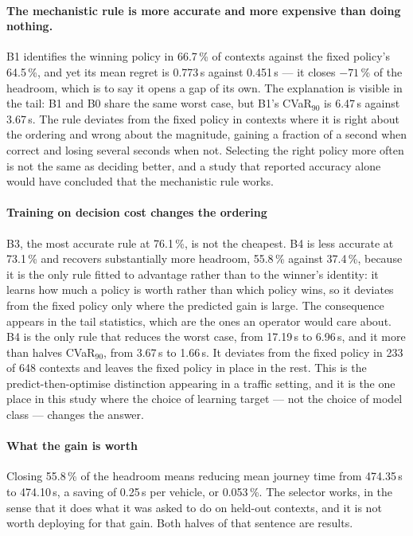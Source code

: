 \paragraph{The mechanistic rule is more accurate and more expensive than doing
nothing.} B1 identifies the winning policy in 66.7\,\% of contexts against the
fixed policy's 64.5\,\%, and yet its mean regret is 0.773\,s against 0.451\,s ---
it closes $-71$\,\% of the headroom, which is to say it opens a gap of its own.
The explanation is visible in the tail: B1 and B0 share the same worst case, but
B1's CVaR$_{90}$ is 6.47\,s against 3.67\,s. The rule deviates from the fixed
policy in contexts where it is right about the ordering and wrong about the
magnitude, gaining a fraction of a second when correct and losing several seconds
when not. Selecting the right policy more often is not the same as deciding
better, and a study that reported accuracy alone would have concluded that the
mechanistic rule works.

\paragraph{Training on decision cost changes the ordering} B3, the most accurate
rule at 76.1\,\%, is not the cheapest. B4 is less accurate at 73.1\,\% and
recovers substantially more headroom, 55.8\,\% against 37.4\,\%, because it is the
only rule fitted to advantage rather than to the winner's identity: it learns how
much a policy is worth rather than which policy wins, so it deviates from the
fixed policy only where the predicted gain is large. The consequence appears in
the tail statistics, which are the ones an operator would care about. B4 is the
only rule that reduces the worst case, from 17.19\,s to 6.96\,s, and it more than
halves CVaR$_{90}$, from 3.67\,s to 1.66\,s. It deviates from the fixed policy in
233 of 648 contexts and leaves the fixed policy in place in the rest. This is the
predict-then-optimise distinction \citep{elmachtoub2022spo} appearing in a traffic
setting, and it is the one place in this study where the choice of learning target
--- not the choice of model class --- changes the answer.

\paragraph{What the gain is worth} Closing 55.8\,\% of the headroom means
reducing mean journey time from 474.35\,s to 474.10\,s, a saving of 0.25\,s per
vehicle, or 0.053\,\%. The selector works, in the sense that it does what it was
asked to do on held-out contexts, and it is not worth deploying for that gain.
Both halves of that sentence are results.


